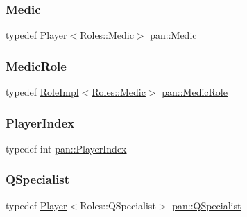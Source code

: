 \mbox{\label{namespacepan_a39b98933acd44960f306cbc3d8e103b2}} 
\subsubsection{\texorpdfstring{Medic}{Medic}}
{\footnotesize\ttfamily typedef \hyperlink{classpan_1_1_player}{Player}$<$Roles\+::\+Medic$>$ \hyperlink{namespacepan_a39b98933acd44960f306cbc3d8e103b2}{pan\+::\+Medic}}

\mbox{\label{namespacepan_a3354cb9412fa301cd3f604393dc07e98}} 
\subsubsection{\texorpdfstring{Medic\+Role}{MedicRole}}
{\footnotesize\ttfamily typedef \hyperlink{classpan_1_1_role_impl}{Role\+Impl}$<$\hyperlink{namespacepan_a5017f84fa51152eae453759537d1ced6a9e41f6e7578581eac9832bcd68732ae1}{Roles\+::\+Medic}$>$ \hyperlink{namespacepan_a3354cb9412fa301cd3f604393dc07e98}{pan\+::\+Medic\+Role}}

\mbox{\label{namespacepan_a0cdabf874fbf1bb3a1f0152d108c2909}} 
\subsubsection{\texorpdfstring{Player\+Index}{PlayerIndex}}
{\footnotesize\ttfamily typedef int \hyperlink{namespacepan_a0cdabf874fbf1bb3a1f0152d108c2909}{pan\+::\+Player\+Index}}

\mbox{\label{namespacepan_aa6a54a1d51f672be7f348ea3883096bc}} 
\subsubsection{\texorpdfstring{Q\+Specialist}{QSpecialist}}
{\footnotesize\ttfamily typedef \hyperlink{classpan_1_1_player}{Player}$<$Roles\+::\+Q\+Specialist$>$ \hyperlink{namespacepan_aa6a54a1d51f672be7f348ea3883096bc}{pan\+::\+Q\+Specialist}}

